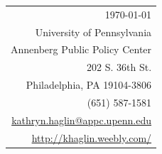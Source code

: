 \documentclass[11pt]{article}
\begin{document}
\hfill%
\begin{tabular}{@{}r@{}}
  \today \\
  [.5em]
University of Pennsylvania \\
Annenberg Public Policy Center \\
202 S. 36th St. \\
Philadelphia, PA 19104-3806 \\
[.5em]
(651) 587-1581 \\
\href{mailto:kathryn.haglin@appc.upenn.edu}{kathryn.haglin@appc.upenn.edu}\\
\href{http://khaglin.weebly.com/}{http://khaglin.weebly.com/}
\end{tabular}

\bigskip




\end{document}
